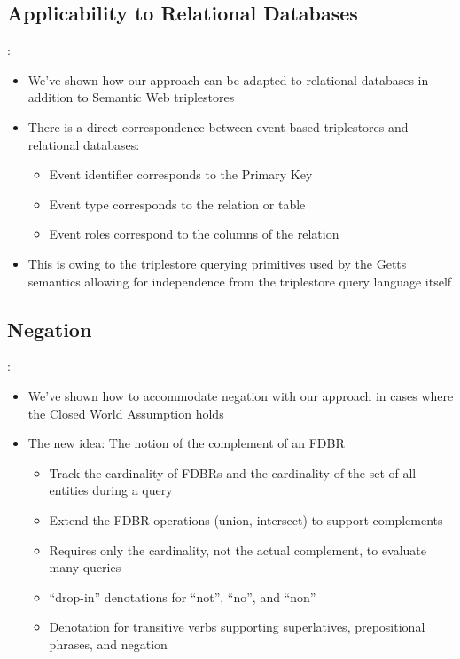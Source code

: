 \documentclass[logoontitle,tabu,supertabular,aspectratio=43]{preney-uwindsor-beamer}
\begin{document}
    \subsection{Applicability to Relational Databases}
    \begin{frame}{\insertsection: \insertsubsection}
    \begin{itemize}
        \item We've shown how our approach can be adapted to relational databases in addition to Semantic Web triplestores
        \item There is a direct correspondence between event-based triplestores and relational databases:
        \begin{itemize}
            \item Event identifier corresponds to the Primary Key
            \item Event type corresponds to the relation or table
            \item Event roles correspond to the columns of the relation
        \end{itemize}
        \item This is owing to the triplestore querying primitives used by the Getts semantics allowing for independence from the triplestore query language itself
    \end{itemize}
    \end{frame}

    \subsection{Negation}
    \begin{frame}{\insertsection: \insertsubsection}
        \begin{itemize}
            \item We've shown how to accommodate negation with our approach in cases where the Closed World Assumption holds
            \item The new idea: The notion of the complement of an FDBR
            \begin{itemize}
                \item Track the cardinality of FDBRs and the cardinality of the set of all entities during a query
                \item Extend the FDBR operations (union, intersect) to support complements
                \item Requires only the cardinality, not the actual complement, to evaluate many queries
                \item ``drop-in'' denotations for ``not'', ``no'', and ``non''
                \item Denotation for transitive verbs supporting superlatives, prepositional phrases, and negation
            \end{itemize}
        \end{itemize}
    \end{frame}
\end{document}
